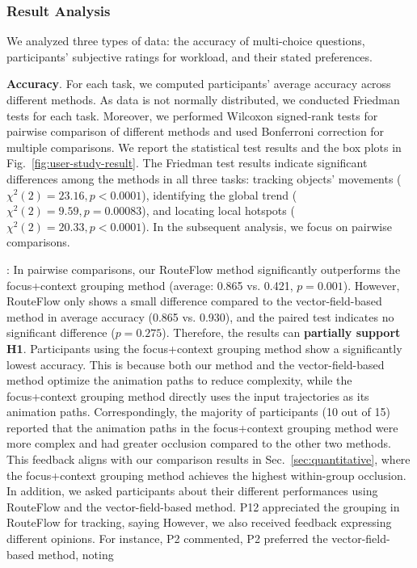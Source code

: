 \subsubsection{Result Analysis} 
We analyzed three types of data: the accuracy of multi-choice questions, participants' subjective ratings for workload, and their stated preferences.  

\noindent\textbf{Accuracy}.
For each task, we computed participants' average accuracy across different methods.
As data is not normally distributed, we conducted Friedman tests for each task. 
Moreover, we performed Wilcoxon signed-rank tests for pairwise comparison of different methods and used Bonferroni correction for multiple comparisons. 
We report the statistical test results and the box plots in Fig.~\ref{fig:user-study-result}.
The Friedman test results indicate significant differences among the methods in all three tasks: tracking objects' movements ($\chi^2(2)=23.16, p < 0.0001$), identifying the global trend ($\chi^2(2)=9.59, p = 0.00083$), and locating local hotspots ($\chi^2(2)=20.33, p < 0.0001$).
In the subsequent analysis, we focus on pairwise comparisons.





\track:
In pairwise comparisons, our RouteFlow method significantly outperforms the focus+context grouping method (average: 0.865 vs. 0.421, $p = 0.001$).
However, RouteFlow only shows a small difference compared to the vector-field-based method in average accuracy (0.865 vs. 0.930), and the paired test indicates no significant difference ($p = 0.275$).
Therefore, the results can \textbf{partially support H1}.
Participants using the focus+context grouping method show a significantly lowest accuracy.
This is because both our method and the vector-field-based method optimize the animation paths to reduce complexity, while the focus+context grouping method directly uses the input trajectories as its animation paths.
Correspondingly, the majority of participants (10 out of 15) reported that the animation paths in the focus+context grouping method were more complex and had greater occlusion compared to the other two methods.
This feedback aligns with our comparison results in Sec.~\ref{sec:quantitative}, where the focus+context grouping method achieves the highest within-group occlusion.
In addition, we asked participants about their different performances using RouteFlow and the vector-field-based method. 
P12 appreciated the grouping in RouteFlow for tracking, saying  
However, we also received feedback expressing different opinions. For instance, P2 commented,  P2 preferred the vector-field-based method, noting 



